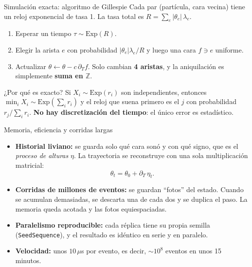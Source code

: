 \documentclass[aspectratio=169,11pt]{beamer}
\newcommand{\Z}{\mathbb{Z}}
\begin{document}
\begin{frame}{Simulación exacta: algoritmo de Gillespie}
  Cada par (partícula, cara vecina) tiene un reloj exponencial de tasa 1. La tasa total es $R=\sum_e|\theta_e|\,\lambda_e$.
  \vspace{2mm}
  \begin{enumerate}
    \item Esperar un tiempo $\tau\sim\mathrm{Exp}(R)$.
    \item Elegir la arista $e$ con probabilidad $|\theta_e|\lambda_e/R$ y luego una cara $f\ni e$ uniforme.
    \item Actualizar $\theta\leftarrow\theta-c\,\partial_Tf$. Solo cambian \textbf{4 aristas}, y la aniquilación es simplemente \textbf{suma en $\Z$}.
  \end{enumerate}
  \vspace{2mm}
  \begin{alertblock}{¿Por qué es exacto?}
    Si $X_i\sim\mathrm{Exp}(r_i)$ son independientes, entonces $\min_iX_i\sim\mathrm{Exp}(\sum_ir_i)$ y el reloj que suena primero es el $j$ con probabilidad $r_j/\sum_ir_i$. \textbf{No hay discretización del tiempo}: el único error es estadístico.
  \end{alertblock}
\end{frame}

\begin{frame}{Memoria, eficiencia y corridas largas}
  \begin{itemize}
    \item \textbf{Historial liviano:} se guarda solo qué cara sonó y con qué signo, que es el \emph{proceso de alturas} $\eta$. La trayectoria se reconstruye con una sola multiplicación matricial:
      \[
        \theta_t=\theta_0+\partial_T\,\eta_t .
      \]
    \item \textbf{Corridas de millones de eventos:} se guardan ``fotos'' del estado. Cuando se acumulan demasiadas, se descarta una de cada dos y se duplica el paso. La memoria queda acotada y las fotos equiespaciadas.
    \item \textbf{Paralelismo reproducible:} cada réplica tiene su propia semilla (\texttt{SeedSequence}), y el resultado es idéntico en serie y en paralelo.
    \item \textbf{Velocidad:} unos $10\,\mu$s por evento, es decir, $\sim10^8$ eventos en unos 15 minutos.
  \end{itemize}
\end{frame}
\end{document}

